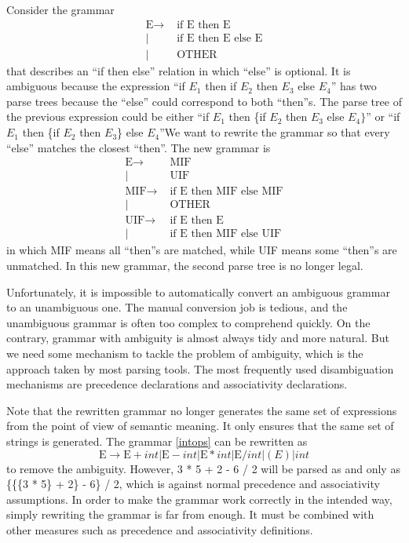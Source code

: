 Consider the grammar
\begin{equation*}
\begin{split}
\text{E}\rightarrow &\text{ if E then E}\\
|&\text{ if E then E else E}\\
|&\text{ OTHER}
\end{split}
\end{equation*}
that describes an ``if then else'' relation in which ``else'' is optional. It is ambiguous because the expression 
``if $E_1$ then if $E_2$ then $E_3$ else $E_4$'' has two parse trees because the ``else'' could correspond to both ``then''s. The parse tree of the previous expression could be either ``if $E_1$ then \{if $E_2$ then $E_3$ else $E_4\}$'' or ``if $E_1$ then \{if $E_2$ then $E_3$\} else $E_4$''We want to rewrite the grammar so that every ``else'' matches the closest ``then''. The new grammar is
\begin{equation*}
\begin{split}
\text{E}\rightarrow &\text{ MIF}\\
|&\text{ UIF}\\
\text{MIF}\rightarrow &\text{ if E then MIF else MIF}\\
|&\text{ OTHER}\\
\text{UIF}\rightarrow &\text{ if E then E}\\
|&\text{ if E then MIF else UIF}
\end{split}
\end{equation*}
in which MIF means all ``then''s are matched, while UIF means some ``then''s are unmatched. In this new grammar, the second parse tree is no longer legal.

Unfortunately, it is impossible to automatically convert an ambiguous grammar to an unambiguous one. The manual conversion job is tedious, and the unambiguous grammar is often too complex to comprehend quickly. On the contrary, grammar with ambiguity is almost always tidy and more natural. But we need some mechanism to tackle the problem of ambiguity, which is the approach taken by most parsing tools. The most frequently used disambiguation mechanisms are precedence declarations and associativity declarations.

Note that the rewritten grammar no longer generates the same set of expressions from the point of view of semantic meaning. It only ensures that the same set of strings is generated. The grammar \eqref{intops} can be rewritten as 
\begin{equation*}
\text{E}\rightarrow \text{E} + int |\text{E} - int | \text{E} * int |\text{E} / int | (E) | int
\end{equation*}
to remove the ambiguity. However, 3 * 5 + 2 - 6 / 2 will be parsed as and only as \{\{\{3 * 5\} + 2\} - 6\} / 2, which is against normal precedence and associativity assumptions. In order to make the grammar work correctly in the intended way, simply rewriting the grammar is far from enough. It must be combined with other measures such as precedence and associativity definitions. 
